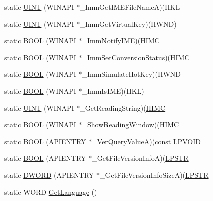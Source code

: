 \begin{DoxyCompactItemize}
\item 
static \hyperlink{class_c_d_x_u_t_i_m_e_edit_box_a9117b4b1a7dc485c06b2c74421b28374}{UINT} (WINAPI $\ast$\_\-ImmGetIMEFileNameA)(HKL
\item 
static \hyperlink{class_c_d_x_u_t_i_m_e_edit_box_a2a1aec6144102d56aa1ecd8500df4cf1}{UINT} (WINAPI $\ast$\_\-ImmGetVirtualKey)(HWND)
\item 
static \hyperlink{class_c_d_x_u_t_i_m_e_edit_box_a92caced3bb5c9e6169fb6ad258fb5f5e}{BOOL} (WINAPI $\ast$\_\-ImmNotifyIME)(\hyperlink{class_c_d_x_u_t_i_m_e_edit_box_aa9afdec726ecd526e2a0abc01537426c}{HIMC}
\item 
static \hyperlink{class_c_d_x_u_t_i_m_e_edit_box_a2dd03073c1bff3083265e0db340e1655}{BOOL} (WINAPI $\ast$\_\-ImmSetConversionStatus)(\hyperlink{class_c_d_x_u_t_i_m_e_edit_box_aa9afdec726ecd526e2a0abc01537426c}{HIMC}
\item 
static \hyperlink{class_c_d_x_u_t_i_m_e_edit_box_aa9307cf2877e1f886685977900653228}{BOOL} (WINAPI $\ast$\_\-ImmSimulateHotKey)(HWND
\item 
static \hyperlink{class_c_d_x_u_t_i_m_e_edit_box_ab3159cf044c8eb289cd7ed646a0fb76d}{BOOL} (WINAPI $\ast$\_\-ImmIsIME)(HKL)
\item 
static \hyperlink{class_c_d_x_u_t_i_m_e_edit_box_af04efdabbdd396a3bee0f746e3248abd}{UINT} (WINAPI $\ast$\_\-GetReadingString)(\hyperlink{class_c_d_x_u_t_i_m_e_edit_box_aa9afdec726ecd526e2a0abc01537426c}{HIMC}
\item 
static \hyperlink{class_c_d_x_u_t_i_m_e_edit_box_a2b8bfe740199d131e01cf47ca67e1270}{BOOL} (WINAPI $\ast$\_\-ShowReadingWindow)(\hyperlink{class_c_d_x_u_t_i_m_e_edit_box_aa9afdec726ecd526e2a0abc01537426c}{HIMC}
\item 
static \hyperlink{class_c_d_x_u_t_i_m_e_edit_box_aa9ff3052536b322df532c0a6bd048988}{BOOL} (APIENTRY $\ast$\_\-VerQueryValueA)(const \hyperlink{class_c_d_x_u_t_i_m_e_edit_box_a1fb0e05d8b96c531c1b69d06391b21f7}{LPVOID}
\item 
static \hyperlink{class_c_d_x_u_t_i_m_e_edit_box_a740dde8f3e869867214a9708eb171664}{BOOL} (APIENTRY $\ast$\_\-GetFileVersionInfoA)(\hyperlink{class_c_d_x_u_t_i_m_e_edit_box_ab59f6a19cb5a1ca421bcb075676ec5f1}{LPSTR}
\item 
static \hyperlink{class_c_d_x_u_t_i_m_e_edit_box_a69382519044b224504e511141bcaeae3}{DWORD} (APIENTRY $\ast$\_\-GetFileVersionInfoSizeA)(\hyperlink{class_c_d_x_u_t_i_m_e_edit_box_ab59f6a19cb5a1ca421bcb075676ec5f1}{LPSTR}
\item 
static WORD \hyperlink{class_c_d_x_u_t_i_m_e_edit_box_aba18bf16401dd53980681c8e80aed8fd}{GetLanguage} ()

\end{DoxyCompactItemize}
